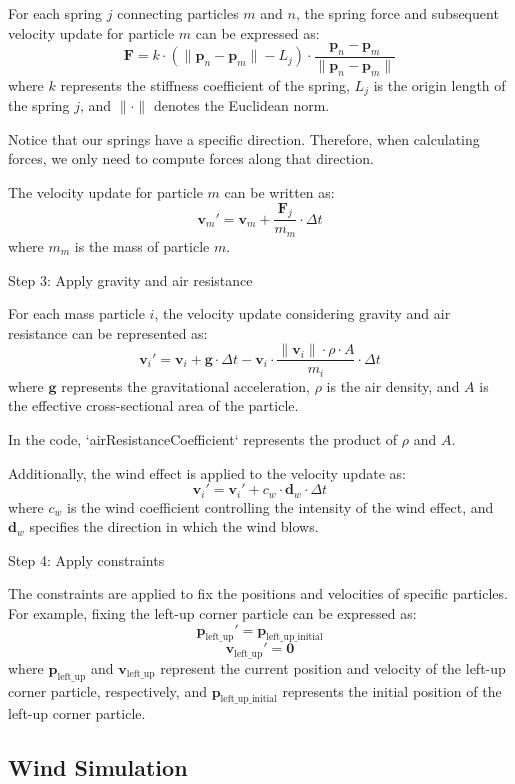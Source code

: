 \documentclass[acmtog]{acmart}
\begin{document}
For each spring \(j\) connecting particles \(m\) and \(n\), the spring force and subsequent velocity update for particle \(m\) can be expressed as:
\[
\mathbf{F} = k \cdot (\|\mathbf{p}_n - \mathbf{p}_m\| - L_j) \cdot \frac{\mathbf{p}_n - \mathbf{p}_m}{\|\mathbf{p}_n - \mathbf{p}_m\|}
\]
where \(k\) represents the stiffness coefficient of the spring, \(L_j\) is the origin length of the spring \(j\), and \(\|\cdot\|\) denotes the Euclidean norm.

Notice that our springs have a specific direction. Therefore, when calculating forces, we only need to compute forces along that direction.

The velocity update for particle \(m\) can be written as:
\[
\mathbf{v}_m' = \mathbf{v}_m + \frac{\mathbf{F}_j}{m_m} \cdot \Delta t
\]
where \(m_m\) is the mass of particle \(m\).

Step 3: Apply gravity and air resistance

For each mass particle \(i\), the velocity update considering gravity and air resistance can be represented as:
\[
\mathbf{v}_i' = \mathbf{v}_i + \mathbf{g} \cdot \Delta t - \mathbf{v}_i \cdot \frac{\|\mathbf{v}_i\| \cdot \rho \cdot A}{m_i} \cdot \Delta t
\]
where \(\mathbf{g}\) represents the gravitational acceleration, \(\rho\) is the air density, and \(A\) is the effective cross-sectional area of the particle.

In the code, `airResistanceCoefficient` represents the product of \(\rho\) and \(A\).

Additionally, the wind effect is applied to the velocity update as:
\[
\mathbf{v}_i' = \mathbf{v}_i' + c_w \cdot \mathbf{d}_w \cdot \Delta t
\]
where \(c_w\) is the wind coefficient controlling the intensity of the wind effect, and \(\mathbf{d}_w\) specifies the direction in which the wind blows.

Step 4: Apply constraints

The constraints are applied to fix the positions and velocities of specific particles. For example, fixing the left-up corner particle can be expressed as:
\[
\mathbf{p}_{\text{left\_up}}' = \mathbf{p}_{\text{left\_up\_initial}}
\]
\[
\mathbf{v}_{\text{left\_up}}' = \mathbf{0}
\]
where \(\mathbf{p}_{\text{left\_up}}\) and \(\mathbf{v}_{\text{left\_up}}\) represent the current position and velocity of the left-up corner particle, respectively, and \(\mathbf{p}_{\text{left\_up\_initial}}\) represents the initial position of the left-up corner particle.

\subsection{Wind Simulation}
\end{document}
